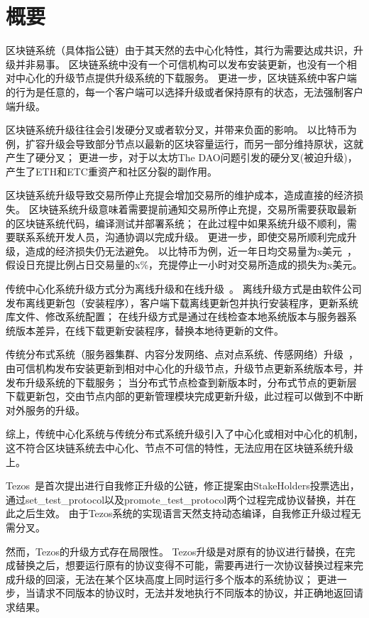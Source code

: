 
\section{概要}

区块链系统（具体指公链）由于其天然的去中心化特性，其行为需要达成共识，升级并非易事。
区块链系统中没有一个可信机构可以发布安装更新，也没有一个相对中心化的升级节点提供升级系统的下载服务。
更进一步，区块链系统中客户端的行为是任意的，每一个客户端可以选择升级或者保持原有的状态，无法强制客户端升级。

区块链系统升级往往会引发硬分叉或者软分叉，并带来负面的影响。
以比特币为例，扩容升级会导致部分节点以最新的区块容量运行，而另一部分维持原状，这就产生了硬分叉；
更进一步，对于以太坊The DAO问题引发的硬分叉(被迫升级)，产生了ETH和ETC重资产和社区分裂的副作用。

区块链系统升级导致交易所停止充提会增加交易所的维护成本，造成直接的经济损失。
区块链系统升级意味着需要提前通知交易所停止充提，交易所需要获取最新的区块链系统代码，编译测试并部署系统；
在此过程中如果系统升级不顺利，需要联系系统开发人员，沟通协调以完成升级。
更进一步，即使交易所顺利完成升级，造成的经济损失仍无法避免。
以比特币为例，近一年日均交易量为x美元~\cite{coinmarketcap}，假设日充提比例占日交易量的x\%，充提停止一小时对交易所造成的损失为x美元。

传统中心化系统升级方式分为离线升级和在线升级~\cite{}。
离线升级方式是由软件公司发布离线更新包（安装程序），客户端下载离线更新包并执行安装程序，更新系统库文件、修改系统配置；
在线升级方式是通过在线检查本地系统版本与服务器系统版本差异，在线下载更新安装程序，替换本地待更新的文件。

传统分布式系统（服务器集群、内容分发网络、点对点系统、传感网络）升级~\cite{ajmani2003scheduling}，由可信机构发布安装更新到相对中心化的升级节点，升级节点更新系统版本号，并发布升级系统的下载服务；
当分布式节点检查到新版本时，分布式节点的更新层下载更新包，交由节点内部的更新管理模块完成更新升级，此过程可以做到不中断对外服务的升级。

综上，传统中心化系统与传统分布式系统升级引入了中心化或相对中心化的机制，这不符合区块链系统去中心化、节点不可信的特性，无法应用在区块链系统升级上。

Tezos~\cite{tezoswhitepaper}是首次提出进行自我修正升级的公链，修正提案由StakeHolders投票选出，通过set\_test\_protocol以及promote\_test\_protocol两个过程完成协议替换，并在此之后生效。
由于Tezos系统的实现语言天然支持动态编译，自我修正升级过程无需分叉。

然而，Tezos的升级方式存在局限性。
Tezos升级是对原有的协议进行替换，在完成替换之后，想要运行原有的协议变得不可能，需要再进行一次协议替换过程来完成升级的回滚，无法在某个区块高度上同时运行多个版本的系统协议；
更进一步，当请求不同版本的协议时，无法并发地执行不同版本的协议，并正确地返回请求结果。

